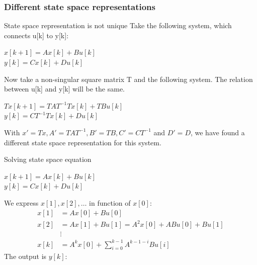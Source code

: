 \begin{frame}
	\frametitle{Different state space representations}
	\begin{alertblock}{State space representation is not unique}
		Take the following system, which connects u[k] to y[k]:
		\begin{center}
			$x[k+1] = A x[k] + B u[k]$ \\
			$y[k] = C x[k] + D u[k] $ 
		\end{center}
		Now take a non-singular square matrix T and the following system. The relation between u[k] and y[k] will be the same.	
		\begin{center}
			$Tx[k+1] = TAT^{-1}Tx[k] + TBu[k]$\\
			$y[k] = C T^{-1}Tx[k] + Du[k]$
		\end{center}
		With $x' = Tx, A' = TAT^{-1},B' = TB,C' = CT^{-1}$ and $D'=D$,  we have found a different state space representation for this system.
		
	\end{alertblock}
\end{frame}
\begin{frame}
	\begin{block}{Solving state space equation}
			\begin{center}
				$x[k+1] = A x[k] + B u[k]$ \\
				$y[k] = C x[k] + D u[k] $ 
			\end{center}
			\vspace{-1em}
			We express $x[1],x[2],\dots$ in function of $x[0]$:
			\vspace{-1em}
			\begin{align*}
					x[1] &= Ax[0]+Bu[0]\\
					x[2] &= Ax[1] + Bu[1] = A^2x[0]+ABu[0]+ Bu[1]\\
					&\vdots\\
					x[k] &= A^kx[0] + \sum\limits_{i=0}^{k-1} A^{k-1-i}Bu[i]
			\end{align*}
			\vspace{-2em}
			The output is $y[k]$:
	\end{block}
\end{frame}
